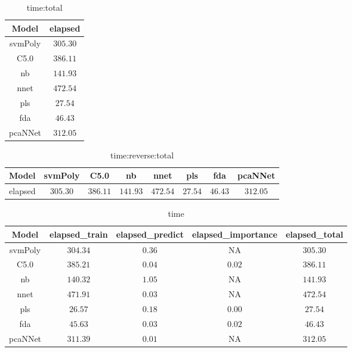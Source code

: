 \begin{table}[!ht]
	\centering
	\begin{tabular}{|c|c|}
		\hline
		Model & elapsed \\ \hline
		svmPoly & $305.30$ \\ \hline
		C5.0 & $386.11$ \\ \hline
		nb & $141.93$ \\ \hline
		nnet & $472.54$ \\ \hline
		pls & $27.54$ \\ \hline
		fda & $46.43$ \\ \hline
		pcaNNet & $312.05$ \\ \hline
	\end{tabular}
	\caption{time:total}
	\label{tab:time:total}
\end{table}

\begin{table}[!ht]
	\centering
	\begin{tabular}{|c|c|c|c|c|c|c|c|}
		\hline
		Model & svmPoly & C5.0 & nb & nnet & pls & fda & pcaNNet \\ \hline
		elapsed & $305.30$ & $386.11$ & $141.93$ & $472.54$ & $27.54$ & $46.43$ & $312.05$ \\ \hline
	\end{tabular}
	\caption{time:reverse:total}
	\label{tab:time:reverse:total}
\end{table}

\begin{table}[!ht]
	\centering
	\begin{tabular}{|c|c|c|c|c|}
		\hline
		Model & elapsed_train & elapsed_predict & elapsed_importance & elapsed_total \\ \hline
		svmPoly & $304.34$ & $0.36$ & NA & $305.30$ \\ \hline
		C5.0 & $385.21$ & $0.04$ & $0.02$ & $386.11$ \\ \hline
		nb & $140.32$ & $1.05$ & NA & $141.93$ \\ \hline
		nnet & $471.91$ & $0.03$ & NA & $472.54$ \\ \hline
		pls & $26.57$ & $0.18$ & $0.00$ & $27.54$ \\ \hline
		fda & $45.63$ & $0.03$ & $0.02$ & $46.43$ \\ \hline
		pcaNNet & $311.39$ & $0.01$ & NA & $312.05$ \\ \hline
	\end{tabular}
	\caption{time}
	\label{tab:time}
\end{table}


